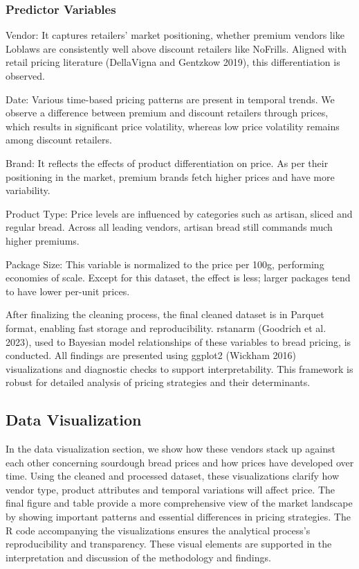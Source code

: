 \documentclass[
  letterpaper,
  DIV=11,
  numbers=noendperiod]{scrartcl}
\begin{document}
\subsubsection{Predictor Variables}\label{predictor-variables}

Vendor: It captures retailers' market positioning, whether premium
vendors like Loblaws are consistently well above discount retailers like
NoFrills. Aligned with retail pricing literature (DellaVigna and
Gentzkow 2019), this differentiation is observed.

Date: Various time-based pricing patterns are present in temporal
trends. We observe a difference between premium and discount retailers
through prices, which results in significant price volatility, whereas
low price volatility remains among discount retailers.

Brand: It reflects the effects of product differentiation on price. As
per their positioning in the market, premium brands fetch higher prices
and have more variability.

Product Type: Price levels are influenced by categories such as artisan,
sliced and regular bread. Across all leading vendors, artisan bread
still commands much higher premiums.

Package Size: This variable is normalized to the price per 100g,
performing economies of scale. Except for this dataset, the effect is
less; larger packages tend to have lower per-unit prices.

After finalizing the cleaning process, the final cleaned dataset is in
Parquet format, enabling fast storage and reproducibility. rstanarm
(Goodrich et al. 2023), used to Bayesian model relationships of these
variables to bread pricing, is conducted. All findings are presented
using ggplot2 (Wickham 2016) visualizations and diagnostic checks to
support interpretability. This framework is robust for detailed analysis
of pricing strategies and their determinants.

\subsection{Data Visualization}\label{data-visualization}

In the data visualization section, we show how these vendors stack up
against each other concerning sourdough bread prices and how prices have
developed over time. Using the cleaned and processed dataset, these
visualizations clarify how vendor type, product attributes and temporal
variations will affect price. The final figure and table provide a more
comprehensive view of the market landscape by showing important patterns
and essential differences in pricing strategies. The R code accompanying
the visualizations ensures the analytical process's reproducibility and
transparency. These visual elements are supported in the interpretation
and discussion of the methodology and findings.
\end{document}
